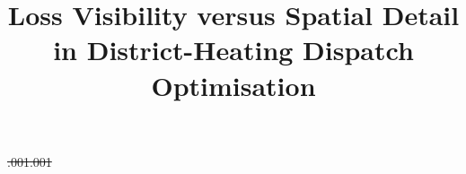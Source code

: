 \documentclass[a4paper,fleqn]{cas-sc} %
\providecommand{\DIFdel}[1]{{\protect\color{red}\sout{#1}}} %
\providecommand{\DIFaddbegin}{} %
\providecommand{\DIFaddend}{} %
\providecommand{\DIFdelbegin}{} %
\providecommand{\DIFdelend}{} %
\providecommand{\textpagefraction}{.001}
\providecommand{\floatpagepagefraction}{1}
\begin{document}
\DIFdelbegin %
\DIFdel{\textpagefraction{.001}
}%


\DIFdelend 

\DIFdelbegin %



\DIFdelend \DIFaddbegin \title[mode=title]{%
  Loss Visibility versus Spatial Detail in District-Heating Dispatch Optimisation}
\DIFaddend 
\end{document}

